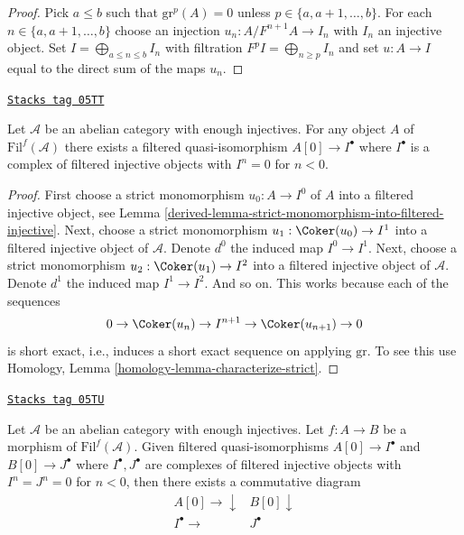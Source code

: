 \begin{proof}
Pick $a \leq b$ such that $\text{gr}^p(A) = 0$ unless
$p \in \{a, a + 1, \ldots, b\}$. For each
$n \in \{a, a + 1, \ldots, b\}$ choose an injection
$u_n : A/F^{n + 1}A \to I_n$ with $I_n$ an injective object.
Set $I = \bigoplus_{a \leq n \leq b} I_n$ with filtration
$F^pI = \bigoplus_{n \geq p} I_n$ and set $u : A \to I$ equal to
the direct sum of the maps $u_n$.
\end{proof}

\begin{lemma}
\label{derived-lemma-filtered-injective-right-resolution-single-object}
\href{https://stacks.math.columbia.edu/tag/05TT}{\texttt{Stacks tag 05TT}}

Let $\mathcal{A}$ be an abelian category with enough injectives.
For any object $A$ of $\text{Fil}^f(\mathcal{A})$ there exists
a filtered quasi-isomorphism $A[0] \to I^\bullet$
where $I^\bullet$ is a complex of filtered injective objects
with $I^n = 0$ for $n < 0$.
\end{lemma}

\begin{proof}

First choose a strict monomorphism $u_0 : A \to I^0$ of $A$ into a filtered
injective object, see
Lemma \ref{derived-lemma-strict-monomorphism-into-filtered-injective}.
Next, choose a strict monomorphism
$u_1 : \Coker(u_0) \to I^1$ into a filtered injective object of
$\mathcal{A}$. Denote $d^0$ the induced map $I^0 \to I^1$.
Next, choose a strict monomorphism $u_2 : \Coker(u_1) \to I^2$ into
a filtered injective object of $\mathcal{A}$. Denote $d^1$ the induced
map $I^1 \to I^2$. And so on. This works because each
of the sequences
$$
0 \to \Coker(u_n) \to I^{n + 1} \to \Coker(u_{n + 1}) \to 0
$$
is short exact, i.e., induces a short exact sequence on applying
$\text{gr}$. To see this use
Homology, Lemma \ref{homology-lemma-characterize-strict}.
\end{proof}

\begin{lemma}
\label{derived-lemma-filtered-injective-right-resolution-map}
\href{https://stacks.math.columbia.edu/tag/05TU}{\texttt{Stacks tag 05TU}}

Let $\mathcal{A}$ be an abelian category with enough injectives.
Let $f : A \to B$ be a morphism of $\text{Fil}^f(\mathcal{A})$.
Given filtered quasi-isomorphisms $A[0] \to I^\bullet$ and
$B[0] \to J^\bullet$ where $I^\bullet, J^\bullet$ are complexes of
filtered injective objects with $I^n = J^n = 0$ for $n < 0$, then
there exists a commutative diagram
$$
\begin{array}{cc}A[0] \longrightarrow\downarrow & B[0] \downarrow \\ I^\bullet \longrightarrow & J^\bullet\end{array}
$$
\end{lemma}

